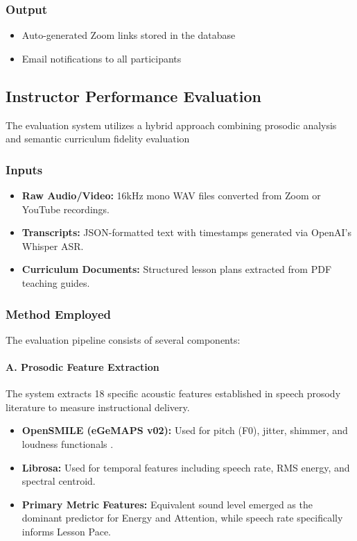 \subsubsection*{Output}
\begin{itemize}
    \item Auto-generated Zoom links stored in the database
    \item Email notifications to all participants
\end{itemize}


\subsection{Instructor Performance Evaluation}

The evaluation system utilizes a hybrid approach combining prosodic analysis and semantic curriculum fidelity evaluation \cite{Stone2019,Almubarak2025}

\subsubsection*{Inputs}
\begin{itemize}
    \item \textbf{Raw Audio/Video:} 16kHz mono WAV files converted from Zoom or YouTube recordings.
    \item \textbf{Transcripts:} JSON-formatted text with timestamps generated via OpenAI's Whisper ASR.
    \item \textbf{Curriculum Documents:} Structured lesson plans extracted from PDF teaching guides.
\end{itemize}

\subsubsection*{Method Employed}

The evaluation pipeline consists of several components:

\paragraph{A. Prosodic Feature Extraction}
The system extracts 18 specific acoustic features established in speech prosody literature to measure instructional delivery.
\begin{itemize}
    \item \textbf{OpenSMILE (eGeMAPS v02):} Used for pitch (F0), jitter, shimmer, and loudness functionals \cite{Eyben2010, Jensen2020}.
    \item \textbf{Librosa:} Used for temporal features including speech rate, RMS energy, and spectral centroid.
    \item \textbf{Primary Metric Features:} Equivalent sound level emerged as the dominant predictor for Energy and Attention, while speech rate specifically informs Lesson Pace.
\end{itemize}

